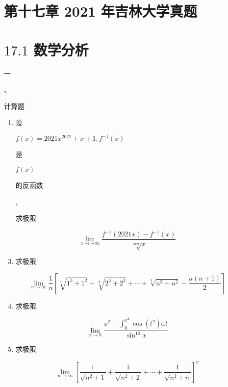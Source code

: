 \documentclass[10pt]{article}
\begin{document}
\section{第十七章 2021 年吉林大学真题}
\section{$17.1$ 数学分析}
\begin{CJK}{UTF8}{mj}一\end{CJK}、\begin{CJK}{UTF8}{mj}计算题\end{CJK}

\begin{enumerate}
  \item \begin{CJK}{UTF8}{mj}设\end{CJK} $f(x)=2021 x^{2021}+x+1, f^{-1}(x)$ \begin{CJK}{UTF8}{mj}是\end{CJK} $f(x)$ \begin{CJK}{UTF8}{mj}的反函数\end{CJK}, \begin{CJK}{UTF8}{mj}求极限\end{CJK}
\end{enumerate}
$$
\lim _{x \rightarrow+\infty} \frac{f^{-1}(2021 x)-f^{-1}(x)}{\sqrt[2021]{x}}
$$

\begin{enumerate}
  \setcounter{enumi}{2}
  \item \begin{CJK}{UTF8}{mj}求极限\end{CJK}
\end{enumerate}
$$
\lim _{n \rightarrow \infty} \frac{1}{n}\left[\sqrt[3]{1^{3}+1^{2}}+\sqrt[3]{2^{3}+2^{2}}+\cdots+\sqrt[3]{n^{3}+n^{2}}-\frac{n(n+1)}{2}\right]
$$

\begin{enumerate}
  \setcounter{enumi}{3}
  \item \begin{CJK}{UTF8}{mj}求极限\end{CJK}
\end{enumerate}
$$
\lim _{x \rightarrow 0} \frac{x^{2}-\int_{0}^{x^{2}} \cos \left(t^{2}\right) \mathrm{d} t}{\sin ^{10} x}
$$

\begin{enumerate}
  \setcounter{enumi}{4}
  \item \begin{CJK}{UTF8}{mj}求极限\end{CJK}
\end{enumerate}
$$
\lim _{n \rightarrow \infty}\left[\frac{1}{\sqrt{n^{2}+1}}+\frac{1}{\sqrt{n^{2}+2}}+\cdots+\frac{1}{\sqrt{n^{2}+n}}\right]^{n}
$$
\end{document}
